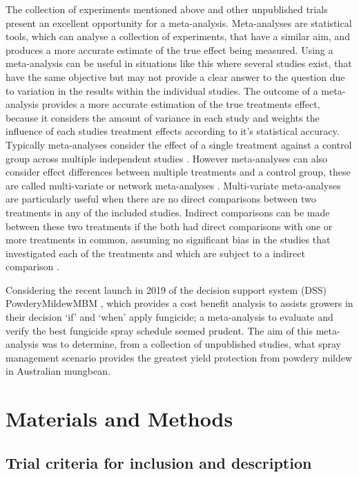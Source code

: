 \documentclass[agronomy,article,submit,moreauthors,pdftex]{mdpi}
\begin{document}
The collection of experiments mentioned above and other unpublished
trials present an excellent opportunity for a meta-analysis.
Meta-analyses are statistical tools, which can analyse a collection of
experiments, that have a similar aim, and produces a more accurate
estimate of the true effect being measured. Using a meta-analysis can be
useful in situations like this where several studies exist, that have
the same objective but may not provide a clear answer to the question
due to variation in the results within the individual studies. The
outcome of a meta-analysis provides a more accurate estimation of the
true treatments effect, because it considers the amount of variance in
each study and weights the influence of each studies treatment effects
according to it's statistical accuracy. Typically meta-analyses consider
the effect of a single treatment against a control group across multiple
independent studies \citep{Madden2011}. However meta-analyses can also
consider effect differences between multiple treatments and a control
group, these are called multi-variate or network meta-analyses
\citep{MaddenEtAl2016}. Multi-variate meta-analyses are particularly
useful when there are no direct comparisons between two treatments in
any of the included studies. Indirect comparisons can be made between
these two treatments if the both had direct comparisons with one or more
treatments in common, assuming no significant bias in the studies that
investigated each of the treatments and which are subject to a indirect
comparison \citep{Jansen2011}.

Considering the recent launch in 2019 of the decision support system
(DSS) PowderyMildewMBM \citep{Diggle}, which provides a cost benefit
analysis to assists growers in their decision `if' and `when' apply
fungicide; a meta-analysis to evaluate and verify the best fungicide
spray schedule seemed prudent. The aim of this meta-analysis was to
determine, from a collection of unpublished studies, what spray
management scenario provides the greatest yield protection from powdery
mildew in Australian mungbean.

\hypertarget{materials-and-methods}{%
\section{Materials and Methods}\label{materials-and-methods}}

\hypertarget{trial-criteria-for-inclusion-and-description}{%
\subsection{Trial criteria for inclusion and
description}\label{trial-criteria-for-inclusion-and-description}}
\end{document}

